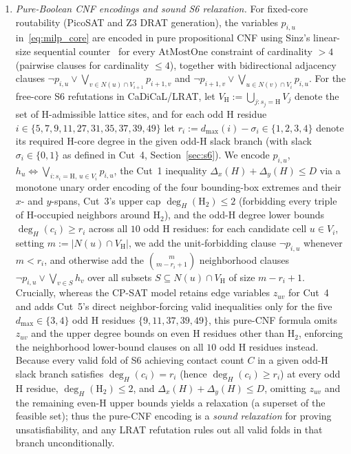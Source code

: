 \documentclass[11pt]{article}
\begin{document}
\begin{enumerate}[leftmargin=*,topsep=2pt,itemsep=2pt]
\item \emph{Pure-Boolean CNF encodings and sound S6 relaxation.} For fixed-core routability (PicoSAT and Z3 DRAT generation), the variables $p_{i,u}$ in~\eqref{eq:milp_core} are encoded in pure propositional CNF using Sinz's linear-size sequential counter~\cite{sinz2005} for every $\mathrm{AtMostOne}$ constraint of cardinality $> 4$ (pairwise clauses for cardinality $\le 4$), together with bidirectional adjacency clauses $\neg p_{i,u} \vee \bigvee_{v \in N(u) \cap V_{i+1}} p_{i+1,v}$ and $\neg p_{i+1,v} \vee \bigvee_{u \in N(v) \cap V_i} p_{i,u}$. For the free-core S6 refutations in CaDiCaL/LRAT, let $V_{\mathrm{H}} := \bigcup_{j : s_j = \mathrm{H}} V_j$ denote the set of H-admissible lattice sites, and for each odd H residue $i \in \{5, 7, 9, 11, 27, 31, 35, 37, 39, 49\}$ let $r_i := d_{\max}(i) - \sigma_i \in \{1, 2, 3, 4\}$ denote its required H-core degree in the given odd-H slack branch (with slack $\sigma_i \in \{0, 1\}$ as defined in Cut~4, Section~\ref{sec:s6}). We encode $p_{i,u}$, $h_u \iff \bigvee_{i : s_i=\mathrm{H},\, u \in V_i} p_{i,u}$, the Cut~1 inequality $\Delta_x(H) + \Delta_y(H) \le D$ via a monotone unary order encoding of the four bounding-box extremes and their $x$- and $y$-spans, Cut~3's upper cap $\deg_H(\mathrm{H}_2) \le 2$ (forbidding every triple of H-occupied neighbors around $\mathrm{H}_2$), and the odd-H degree lower bounds $\deg_H(c_i) \ge r_i$ across all $10$ odd H residues: for each candidate cell $u \in V_i$, setting $m := |N(u) \cap V_{\mathrm{H}}|$, we add the unit-forbidding clause $\neg p_{i,u}$ whenever $m < r_i$, and otherwise add the $\binom{m}{m - r_i + 1}$ neighborhood clauses $\neg p_{i,u} \vee \bigvee_{v \in S} h_v$ over all subsets $S \subseteq N(u) \cap V_{\mathrm{H}}$ of size $m - r_i + 1$. Crucially, whereas the CP-SAT model retains edge variables $z_{uv}$ for Cut~4 and adds Cut~5's direct neighbor-forcing valid inequalities only for the five $d_{\max} \in \{3, 4\}$ odd H residues $\{9, 11, 37, 39, 49\}$, this pure-CNF formula omits $z_{uv}$ and the upper degree bounds on even H residues other than $\mathrm{H}_2$, enforcing the neighborhood lower-bound clauses on all $10$ odd H residues instead. Because every valid fold of S6 achieving contact count $C$ in a given odd-H slack branch satisfies $\deg_H(c_i) = r_i$ (hence $\deg_H(c_i) \ge r_i$) at every odd H residue, $\deg_H(\mathrm{H}_2) \le 2$, and $\Delta_x(H) + \Delta_y(H) \le D$, omitting $z_{uv}$ and the remaining even-H upper bounds yields a relaxation (a superset of the feasible set); thus the pure-CNF encoding is a \emph{sound relaxation} for proving unsatisfiability, and any LRAT refutation rules out all valid folds in that branch unconditionally.
\end{enumerate}
\end{document}
